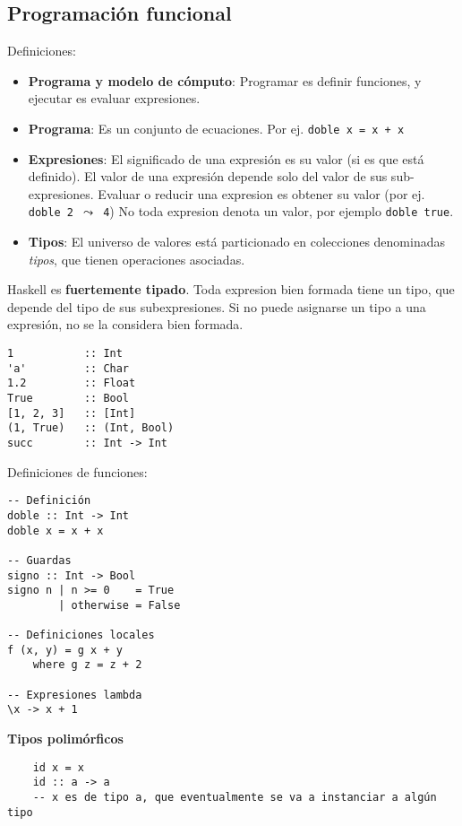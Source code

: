 \documentclass{report}
\theoremstyle{definition} %
\begin{document}
\subsection{Programación funcional}

Definiciones:

\begin{itemize}
    \item \textbf{Programa y modelo de cómputo}: Programar es definir
    funciones, y ejecutar es evaluar expresiones.
    \item \textbf{Programa}: Es un conjunto de ecuaciones. Por ej.
    \texttt{doble x = x + x}
    \item \textbf{Expresiones}: El significado de una expresión es su valor
    (si es que está definido). El valor de una expresión depende solo del
    valor de sus sub-expresiones. Evaluar o reducir una expresion es obtener
    su valor (por ej. \texttt{doble 2 $\leadsto$ 4})
    No toda expresion denota un valor, por ejemplo \texttt{doble true}.
    \item \textbf{Tipos}: El universo de valores está particionado en
    colecciones denominadas \textit{tipos}, que tienen operaciones asociadas.
\end{itemize}

Haskell es \textbf{fuertemente tipado}. Toda expresion bien formada tiene un
tipo, que depende del tipo de sus subexpresiones. Si no puede asignarse un tipo
a una expresión, no se la considera bien formada.

\begin{verbatim}
1           :: Int
'a'         :: Char
1.2         :: Float
True        :: Bool
[1, 2, 3]   :: [Int]
(1, True)   :: (Int, Bool)
succ        :: Int -> Int
\end{verbatim}

Definiciones de funciones:

\begin{verbatim}
-- Definición
doble :: Int -> Int
doble x = x + x

-- Guardas
signo :: Int -> Bool
signo n | n >= 0    = True
        | otherwise = False

-- Definiciones locales
f (x, y) = g x + y
    where g z = z + 2

-- Expresiones lambda
\x -> x + 1
\end{verbatim}

\textbf{Tipos polimórficos}

\begin{verbatim}
    id x = x
    id :: a -> a
    -- x es de tipo a, que eventualmente se va a instanciar a algún tipo
\end{verbatim}
\end{document}
